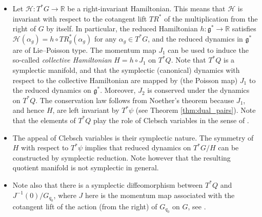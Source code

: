 \documentclass[12pt]{amsart}
\begin{document}
\begin{itemize}
\item Let $\mathcal{H}:T^*G \to \mathbb{R}$ be a right-invariant Hamiltonian. This means that $\mathcal{H}$ is invariant with respect to the  cotangent lift $TR^*$ of the multiplication from the right of $G$ by itself. In particular, the reduced Hamiltonian $h:\mathfrak{g}^* \to \mathbb{R}$ satisfies $\mathcal{H}(\alpha_g) = h \circ TR_g^*(\alpha_g)$ for any $\alpha_g \in T^*G$, and the reduced dynamics in $\mathfrak{g}^*$ are of Lie--Poisson type. The momentum map $J_1$ can be used to induce the so-called \emph{collective Hamiltonian} $H = h\circ J_1$ on $T^*Q$. Note that $T^*Q$ is a symplectic manifold, and that the symplectic (canonical) dynamics with respect to the collective Hamiltonian are mapped by (the Poisson map) $J_1$ to the reduced dynamics on $\mathfrak{g}^*$. Moreover, $J_2$ is conserved under the dynamics on $T^*Q$. The conservation law follows from Noether's theorem because $J_1$, and hence $H$, are left invariant by $T^*\psi$ (see Theorem \ref{thm:dual_pairs}).  Note that the elements of $T^*Q$ play the role of Clebsch variables in the sense of \cite{MarsdenWeinstein1983}.
%
\item The appeal of Clebsch variables is their symplectic nature. The symmetry of $H$ with respect to $T^*\psi$ implies that reduced dynamics on $T^*G/H$ can be constructed by symplectic reduction. Note however that the resulting quotient manifold is not symplectic in general.
%
\item
Note also that there is a symplectic diffeomorphism between $T^*Q$ and $J^{-1}(0)/G_{q_0}$, where $J$ here is the momentum map associated with the cotangent lift of the action (from the right) of $G_{q_0}$ on $G$, see \cite[Theorem~2.2.2]{HRS}.
\end{itemize}
\end{document}
